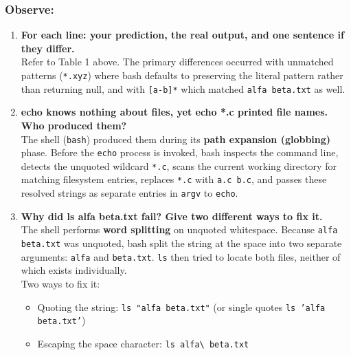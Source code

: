 \documentclass{labreport}
\begin{document}
\subsubsection*{Observe:}
\begin{enumerate}[leftmargin=*]
    \item \textbf{For each line: your prediction, the real output, and one sentence if they differ.}\\[0.2em]
    Refer to Table 1 above. The primary differences occurred with unmatched patterns (\texttt{*.xyz}) where bash defaults to preserving the literal pattern rather than returning null, and with \texttt{[a-b]*} which matched \texttt{alfa beta.txt} as well.

    \item \textbf{echo knows nothing about files, yet echo *.c printed file names. Who produced them?}\\[0.2em]
    The shell (\texttt{bash}) produced them during its \textbf{path expansion (globbing)} phase. Before the \texttt{echo} process is invoked, bash inspects the command line, detects the unquoted wildcard \texttt{*.c}, scans the current working directory for matching filesystem entries, replaces \texttt{*.c} with \texttt{a.c b.c}, and passes these resolved strings as separate entries in \texttt{argv} to \texttt{echo}.

    \item \textbf{Why did ls alfa beta.txt fail? Give two different ways to fix it.}\\[0.2em]
    The shell performs \textbf{word splitting} on unquoted whitespace. Because \texttt{alfa beta.txt} was unquoted, bash split the string at the space into two separate arguments: \texttt{alfa} and \texttt{beta.txt}. \texttt{ls} then tried to locate both files, neither of which exists individually.\\
    Two ways to fix it:
    \begin{itemize}[noitemsep, topsep=2pt]
        \item Quoting the string: \texttt{ls "alfa beta.txt"} (or single quotes \texttt{ls 'alfa beta.txt'})
        \item Escaping the space character: \texttt{ls alfa\textbackslash\ beta.txt}
    \end{itemize}


\end{enumerate}
\end{document}
